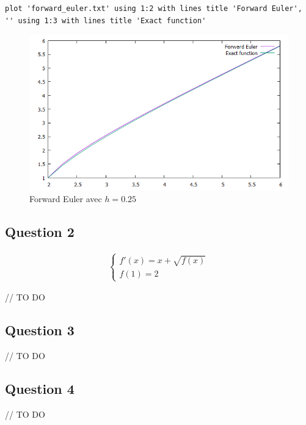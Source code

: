 \begin{lstlisting}
plot 'forward_euler.txt' using 1:2 with lines title 'Forward Euler', '' using 1:3 with lines title 'Exact function'
\end{lstlisting}

\begin{figure}[H]
	\caption{\label{12_forward_1} Forward Euler avec $h=0.25$}
	\centering
	\includegraphics[scale = 0.6]{12_forward_1.png}
\end{figure}


\subsection{Question 2}

\begin{equation}
	\begin{aligned}
	\begin{cases}
	f'(x) = x + \sqrt{f(x)}\\
	f(1) = 2
	\end{cases}
	\end{aligned}
\end{equation}

// TO DO

\subsection{Question 3}

// TO DO

\subsection{Question 4}

// TO DO